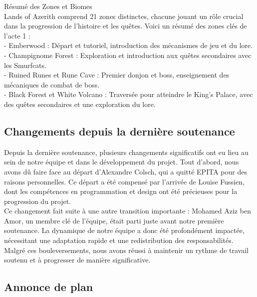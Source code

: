 Résumé des Zones et Biomes
\\

Lands of Azerith comprend 21 zones distinctes, chacune jouant un rôle crucial dans la progression de l'histoire et les quêtes. Voici un résumé des zones clés de l'acte 1 :
\\

- Emberwood : Départ et tutoriel, introduction des mécanismes de jeu et du lore.
\\

- Champignome Forest : Exploration et introduction aux quêtes secondaires avec les Smurfcats.
\\

- Ruined Runes et Rune Cave : Premier donjon et boss, enseignement des mécaniques de combat de boss.
\\

- Black Forest et White Volcano : Traversée pour atteindre le King's Palace, avec des quêtes secondaires et une exploration du lore.
\\

\subsection{Changements depuis la dernière soutenance}

Depuis la dernière soutenance, plusieurs changements significatifs ont eu lieu au sein de notre équipe et dans le développement du projet.
Tout d'abord, nous avons dû faire face au départ d'Alexandre Colsch, qui a quitté EPITA  pour des raisons personnelles.
Ce départ a été compensé par l'arrivée de Louise Fussien, dont les compétences en programmation et design ont été précieuses pour la progression du projet.
\\

Ce changement fait suite à une autre transition importante : Mohamed Aziz ben Amor, un membre clé de l'équipe, était parti juste avant notre première soutenance.
La dynamique de notre équipe a donc été profondément impactée, nécessitant une adaptation rapide et une redistribution des responsabilités.
\\

Malgré ces bouleversements, nous avons réussi à maintenir un rythme de travail soutenu et à progresser de manière significative.
\\

\subsection{Annonce de plan}

